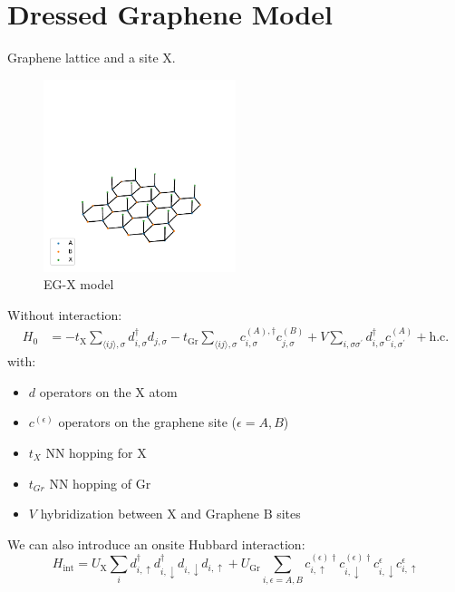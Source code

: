 \documentclass[../notes.tex]{subfiles}
\begin{document}
\section{Dressed Graphene Model}\label{sec:dressed graphene model}

Graphene lattice and a site X\@.
\begin{figure}[htb]
	\centering
	\includegraphics[width=0.5\textwidth]{images/eg-x lattice}
	\caption{EG-X model}
	\label{fig:eg-x model}
\end{figure}

Without interaction:
\begin{align}
	H_0 &= -t_{\mathrm{X}} \sum_{\langle ij \rangle, \sigma} d_{i, \sigma}^{\dagger} d_{j, \sigma}
	-t_{\mathrm{Gr}} \sum_{\langle ij \rangle, \sigma}
	c_{i, \sigma}^{(A), \dagger} c_{j, \sigma}^{(B)}
	+ V \sum_{i, \sigma \sigma^{\prime}}
	d_{i, \sigma}^{\dagger} c_{i, \sigma^{\prime}}^{(A)} + \mathrm{h.c.}
	\label{eq:EG-X model Hamiltonian non-interacting}
\end{align}
with:
\begin{itemize}
	\item \(d\) operators on the X atom
	\item \(c^{(\epsilon)}\) operators on the graphene site (\(\epsilon = A, B\))
	\item \(t_X\) NN hopping for X
	\item \(t_{Gr}\) NN hopping of Gr
	\item \(V\) hybridization between \(\mathrm{X}\) and Graphene \(\mathrm{B}\) sites
\end{itemize}
We can also introduce an onsite Hubbard interaction:
\begin{equation}
	H_{\mathrm{int}} = U_{\mathrm{X}} \sum_{i} d_{i, \uparrow}^{\dagger} d_{i, \downarrow}^{\dagger} d_{i, \downarrow} d_{i, \uparrow}
	+ U_{\mathrm{Gr}} \sum_{i, \epsilon=A, B} c_{i, \uparrow}^{(\epsilon) \dagger} c_{i, \downarrow}^{(\epsilon) \dagger} c_{i, \downarrow}^{\epsilon} c_{i, \uparrow}^{\epsilon}
\end{equation}
\end{document}
